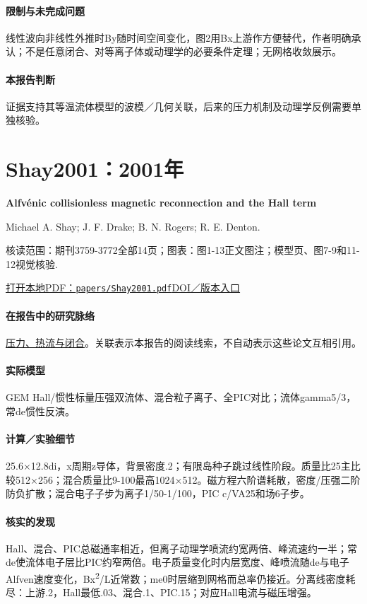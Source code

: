 \paragraph{限制与未完成问题}线性波向非线性外推时By随时间空间变化，图2用Bx上游作方便替代，作者明确承认；不是任意闭合、对等离子体或动理学的必要条件定理；无网格收敛展示。

\paragraph{本报告判断}证据支持其等温流体模型的波模／几何关联，后来的压力机制及动理学反例需要单独核验。

\section{Shay2001：2001年}\label{paper:Shay2001}

\textbf{Alfvénic collisionless magnetic reconnection and the Hall term}\citep{Shay2001}\

Michael A. Shay;  J. F. Drake;  B. N. Rogers;  R. E. Denton.

\textsf{核读范围：}期刊3759-3772全部14页；\textsf{图表：}图1-13正文图注；模型页、图7-9和11-12视觉核验.

\href{run:papers/Shay2001.pdf}{打开本地PDF：\texttt{papers/Shay2001.pdf}}\quad\href{https://doi.org/10.1029/1999ja001007}{DOI／版本入口}

\paragraph{在报告中的研究脉络}\hyperref[story:closure]{压力、热流与闭合}。关联表示本报告的阅读线索，不自动表示这些论文互相引用。

\paragraph{实际模型}GEM Hall/惯性标量压强双流体、混合粒子离子、全PIC对比；流体gamma5/3，常de惯性反演。

\paragraph{计算／实验细节}25.6×12.8di，x周期z导体，背景密度.2；有限岛种子跳过线性阶段。质量比25主比较512×256；混合质量比9-100最高1024×512。磁方程六阶谱耗散，密度/压强二阶防负扩散；混合电子子步为离子1/50-1/100，PIC c/VA25和场6子步。

\paragraph{核实的发现}Hall、混合、PIC总磁通率相近，但离子动理学喷流约宽两倍、峰流速约一半；常de使流体电子层比PIC约窄两倍。电子质量变化时内层宽度、峰喷流随de与电子Alfven速度变化，Bx\textsuperscript{2}/L近常数；me0时层缩到网格而总率仍接近。分离线密度耗尽：上游.2，Hall最低.03、混合.1、PIC.15；对应Hall电流与磁压增强。

